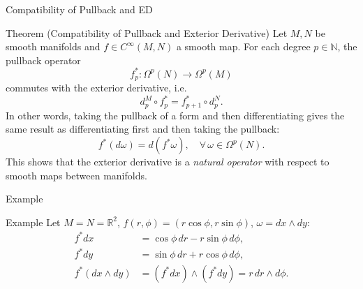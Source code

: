 \begin{frame}{Compatibility of Pullback and ED}
\vspace{-0.3cm}
\begin{block}{Theorem (Compatibility of Pullback and Exterior Derivative)}
Let \(M,N\) be smooth manifolds and \(f\in C^\infty(M,N)\) a smooth map. For each degree \(p\in\mathbb{N}\), the pullback operator
\vspace{-0.2cm}
\[
f_p^*:\Omega^p(N)\to\Omega^p(M)
\]
\vspace{-0.1cm}
commutes with the exterior derivative, i.e.
\vspace{-0.2cm}
\[
d_p^M\circ f_p^* = f_{p+1}^*\circ d_p^N.
\]
\vspace{-0.1cm}
In other words, taking the pullback of a form and then differentiating gives the same result as differentiating first and then taking the pullback:
\vspace{-0.2cm}
\[
f^*(d\omega)=d(f^*\omega), \quad \forall\,\omega\in\Omega^p(N).
\]
This shows that the exterior derivative is a \emph{natural operator} with respect to smooth maps between manifolds.
\end{block}

\end{frame}

\begin{frame}{Example}
\vspace{-0.2cm}
\begin{center}
\end{center}
\vspace{-0.3cm}
\begin{block}{Example}
Let \(M=N=\mathbb{R}^2\), \(f(r,\phi)=(r\cos\phi,r\sin\phi)\), \(\omega=dx\wedge dy\):
\[
\begin{aligned}
f^*dx &= \cos\phi\,dr - r\sin\phi\,d\phi,\\
f^*dy &= \sin\phi\,dr + r\cos\phi\,d\phi,\\
f^*(dx\wedge dy)&=(f^*dx)\wedge(f^*dy)=r\,dr\wedge d\phi.
\end{aligned}
\]
\vspace{-0.1cm}
\end{block}
\end{frame}

